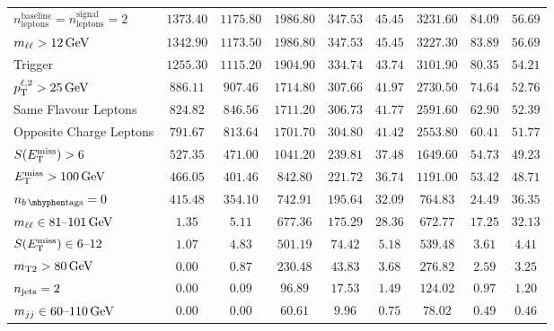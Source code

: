 \begin{sidewaystable}[tp]
{\begin{tabular}{lcccccccc}
$n_\mathrm{leptons}^\mathrm{baseline} = n_\mathrm{leptons}^\mathrm{signal} = 2$     & $1373.40$ & $1175.80$ & $1986.80$ & $347.53$ & $45.45$ & $3231.60$ & $84.09$ & $56.69$ \\
$\mll > 12\,\eV[G]$                                          & $1342.90$ & $1173.50$ & $1986.80$ & $347.53$ & $45.45$ & $3227.30$ & $83.89$ & $56.69$ \\
Trigger                                                   & $1255.30$ & $1115.20$ & $1904.90$ & $334.74$ & $43.74$ & $3101.90$ & $80.35$ & $54.21$ \\
$\pt^{\ell,2} > 25\,\eV[G]$                         & $886.11$ & $907.46$ & $1714.80$ & $307.66$ & $41.97$ & $2730.50$ & $74.64$ & $52.76$ \\
Same Flavour Leptons                                       & $824.82$ & $846.56$ & $1711.20$ & $306.73$ & $41.77$ & $2591.60$ & $62.90$ & $52.39$ \\
Opposite Charge Leptons                                   & $791.67$ & $813.64$ & $1701.70$ & $304.80$ & $41.42$ & $2553.80$ & $60.41$ & $51.77$ \\
$\metsig > 6$                                               & $527.35$ & $471.00$ & $1041.20$ & $239.81$ & $37.48$ & $1649.60$ & $54.73$ & $49.23$ \\
$\met > 100\,\eV[G]$                                           & $466.05$ & $401.46$ & $842.80$ & $221.72$ & $36.74$ & $1191.00$ & $53.42$ & $48.71$ \\
\hline
$\nbtag = 0$                                             & $415.48$ & $354.10$ & $742.91$ & $195.64$ & $32.09$ & $764.83$ & $24.49$ & $36.35$ \\
$\mll \in 81\text{--}101\,\eV[G]$                            & $1.35$ & $5.11$ & $677.36$ & $175.29$ & $28.36$ & $672.77$ & $17.25$ & $32.13$ \\
$\metsig \in 6\text{--}12$                                & $1.07$ & $4.83$ & $501.19$ & $74.42$ & $5.18$ & $539.48$ & $3.61$ & $4.41$ \\
$\mttwo > 80\,\eV[G]$                                        & $0.00$ & $0.87$ & $230.48$ & $43.83$ & $3.68$ & $276.82$ & $2.59$ & $3.25$ \\
$\njet = 2$                                  & $0.00$ & $0.09$ & $96.89$ & $17.53$ & $1.49$ & $124.02$ & $0.97$ & $1.20$ \\
$\mjj \in 60\text{--}110\,\eV[G]$                            & $0.00$ & $0.00$ & $60.61$ & $9.96$ & $0.75$ & $78.02$ & $0.49$ & $0.46$ \\

\end{tabular}}
\end{sidewaystable}

